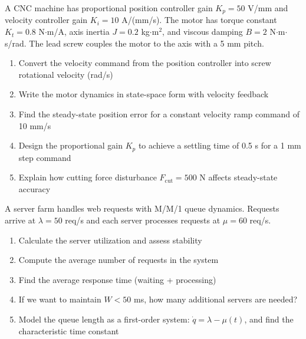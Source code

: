 \begin{exercise}
A CNC machine has proportional position controller gain $K_p = 50$ V/mm and velocity controller gain $K_i = 10$ A/(mm/s). The motor has torque constant $K_t = 0.8$ N$\cdot$m/A, axis inertia $J = 0.2$ kg$\cdot$m$^2$, and viscous damping $B = 2$ N$\cdot$m$\cdot$s/rad. The lead screw couples the motor to the axis with a 5 mm pitch.
\begin{enumerate}[label=(\alph*)]
    \item Convert the velocity command from the position controller into screw rotational velocity (rad/s)
    \item Write the motor dynamics in state-space form with velocity feedback
    \item Find the steady-state position error for a constant velocity ramp command of 10 mm/s
    \item Design the proportional gain $K_p$ to achieve a settling time of 0.5 s for a 1 mm step command
    \item Explain how cutting force disturbance $F_{\text{cut}} = 500$ N affects steady-state accuracy
\end{enumerate}
\end{exercise}

\begin{exercise}
A server farm handles web requests with M/M/1 queue dynamics. Requests arrive at $\lambda = 50$ req/s and each server processes requests at $\mu = 60$ req/s.
\begin{enumerate}[label=(\alph*)]
    \item Calculate the server utilization and assess stability
    \item Compute the average number of requests in the system
    \item Find the average response time (waiting + processing)
    \item If we want to maintain $W < 50$ ms, how many additional servers are needed?
    \item Model the queue length as a first-order system: $\dot{q} = \lambda - \mu(t)$, and find the characteristic time constant
\end{enumerate}
\end{exercise}

